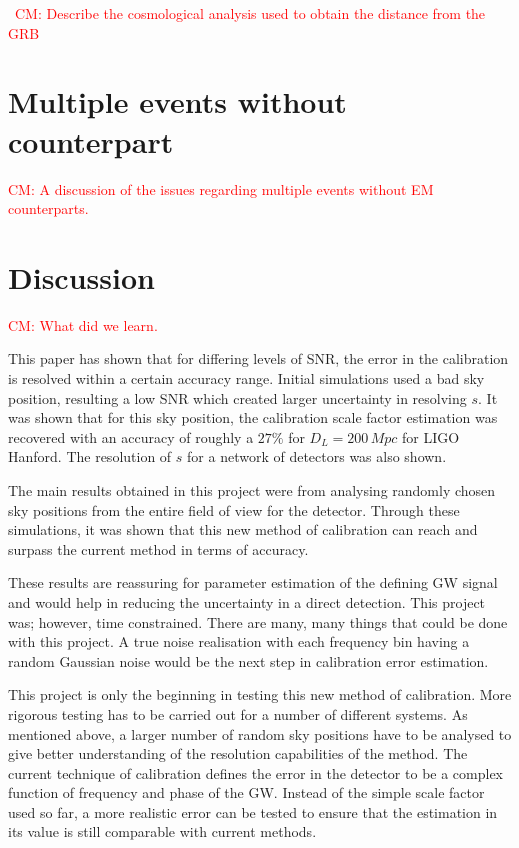 \documentclass[10pt]{iopart}
\newcommand{\cm}[1]{\textcolor{red}{CM: #1}}
\begin{document}
~\cm{Describe the cosmological analysis used to obtain the distance from the
GRB}

\section{Multiple events without counterpart\label{sec:multiple}}

\cm{A discussion of the issues regarding multiple events
without EM counterparts.}

\section{Discussion\label{sec:discussion}}

\cm{What did we learn.}

This paper has shown that for differing levels of SNR, the error in the
calibration is resolved within a certain accuracy range. Initial simulations
used a bad sky position, resulting a low SNR which created larger uncertainty
in resolving $s$. It was shown that for this sky position, the calibration
scale factor estimation was recovered with an accuracy of roughly a $27\%$ for
$D_{L} = 200\,Mpc$ for LIGO Hanford. The resolution of $s$ for a network of
detectors was also shown.

The main results obtained in this project were from analysing randomly chosen
sky positions from the entire field of view for the detector. Through these
simulations, it was shown that this new method of calibration can reach and
surpass the current method in terms of accuracy.

These results are reassuring for parameter estimation of the defining GW signal
and would help in reducing the uncertainty in a direct detection. This project
was; however, time constrained. There are many, many things that could be done
with this project. A true noise realisation with each frequency bin having a
random Gaussian noise would be the next step in calibration error estimation.

This project is only the beginning in testing this new method of calibration.
More rigorous testing has to be carried out for a number of different systems.
As mentioned above, a larger number of random sky positions have to be analysed
to give better understanding of the resolution capabilities of the method. The
current technique of calibration defines the error in the detector to be a
complex function of frequency and phase of the GW. Instead of the simple scale
factor used so far, a more realistic error can be tested to ensure that the
estimation in its value is still comparable with current methods.
\end{document}

